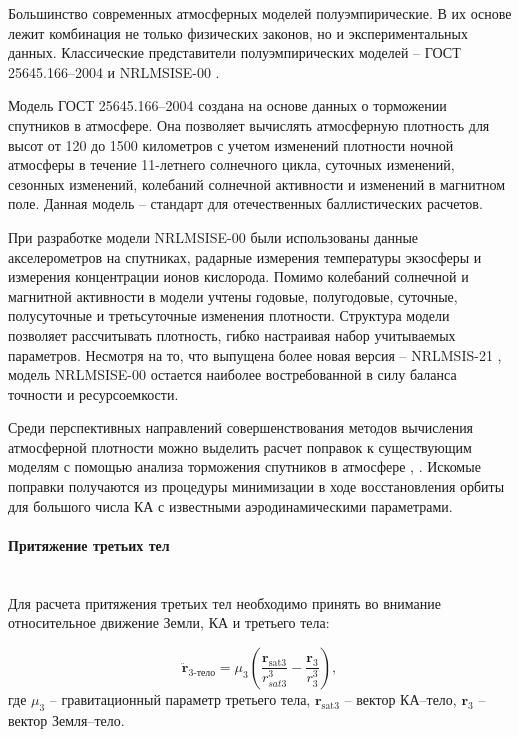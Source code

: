 Большинство современных атмосферных моделей полуэмпирические. 
В их основе лежит комбинация не только
физических законов, но и экспериментальных данных. 
Классические представители полуэмпирических моделей 
-- ГОСТ 25645.166--2004 \cite{gost1662004} и NRLMSISE-00 \cite{picone2002}.

Модель ГОСТ 25645.166--2004 создана на основе данных о торможении спутников в атмосфере.
Она позволяет вычислять атмосферную плотность для высот от 120 до 1500 километров с учетом
изменений плотности ночной атмосферы в течение 11-летнего солнечного цикла, суточных изменений,
сезонных изменений, колебаний солнечной активности и изменений в магнитном поле.
Данная модель -- стандарт для отечественных баллистических расчетов.

При разработке модели NRLMSISE-00 были использованы данные акселерометров на спутниках,
радарные измерения температуры экзосферы и измерения концентрации ионов кислорода.
Помимо колебаний солнечной и магнитной активности в модели
учтены годовые, полугодовые, суточные, полусуточные и третьсуточные изменения плотности.
Структура модели позволяет рассчитывать плотность, гибко настраивая набор учитываемых параметров.
Несмотря на то, что выпущена более новая версия -- NRLMSIS-21 \cite{emmert2021, emmert2022}, 
модель NRLMSISE-00 остается наиболее востребованной в силу баланса точности и ресурсоемкости.

Среди перспективных направлений совершенствования методов вычисления атмосферной плотности 
можно выделить расчет поправок к существующим моделям с помощью анализа торможения спутников
в атмосфере \cite{cefola2003}, \cite{tulin2018}. Искомые поправки получаются из процедуры минимизации в ходе
восстановления орбиты для большого числа КА с известными
аэродинамическими параметрами.

\paragraph{Притяжение третьих тел} \mbox{} \\

Для расчета притяжения третьих тел необходимо принять во внимание относительное движение
Земли, КА и третьего тела:

\begin{equation*}
    \ddot{\mathbf{r}}_{\text{3-тело}} = \mu_3 \left( \frac{\mathbf{r}_{\text{sat3}}}{r^3_{sat3}}
                                    - \frac{\mathbf{r}_{\text{3}}}{r^3_{3}} \right),
\end{equation*}
где $\mu_3$ -- гравитационный параметр третьего тела,
 $\mathbf{r}_{\text{sat3}}$ -- вектор КА--тело, 
 $\mathbf{r}_{3}$ -- вектор Земля--тело. 

